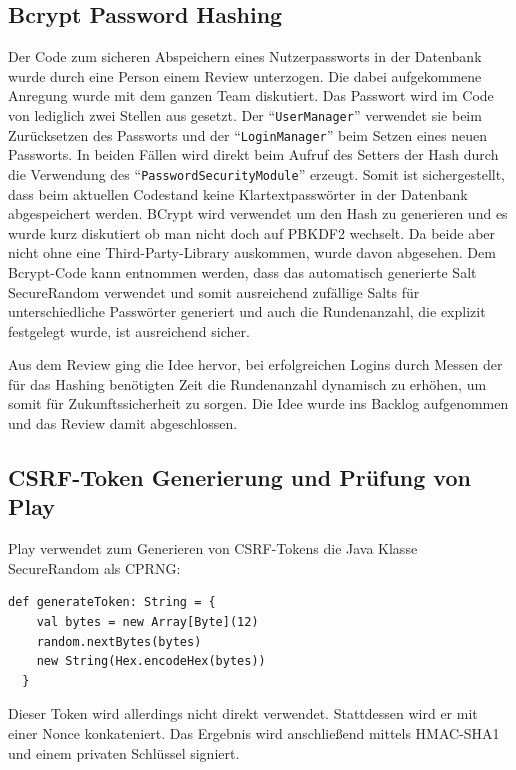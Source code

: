 \documentclass[12pt,DIV14,BCOR10mm,a4paper,parskip=half-,headsepline,headinclude,english,ngerman,bibliography=totocnumbered]{scrreprt}
\begin{document}
\subsection{Bcrypt Password Hashing}
Der Code zum sicheren Abspeichern eines Nutzerpassworts in der Datenbank wurde durch eine Person einem Review unterzogen. Die dabei aufgekommene Anregung wurde mit dem ganzen Team diskutiert. Das Passwort wird im Code von lediglich zwei Stellen aus gesetzt. Der \enquote{\texttt{UserManager}} verwendet sie beim Zurücksetzen des Passworts und der \enquote{\texttt{LoginManager}} beim Setzen eines neuen Passworts. In beiden Fällen wird direkt beim Aufruf des Setters der Hash durch die Verwendung des \enquote{\texttt{PasswordSecurityModule}} erzeugt. Somit ist sichergestellt, dass beim aktuellen Codestand keine Klartextpasswörter in der Datenbank abgespeichert werden. BCrypt wird verwendet um den Hash zu generieren und es wurde kurz diskutiert ob man nicht doch auf PBKDF2 wechselt. Da beide aber nicht ohne eine Third-Party-Library auskommen, wurde davon abgesehen. Dem Bcrypt-Code \autocite{BcryptCode} kann entnommen werden, dass das automatisch generierte Salt SecureRandom verwendet und somit ausreichend zufällige Salts für unterschiedliche Passwörter generiert und auch die Rundenanzahl, die explizit festgelegt wurde, ist ausreichend sicher.

Aus dem Review ging die Idee hervor, bei erfolgreichen Logins durch Messen der für das Hashing benötigten Zeit die Rundenanzahl dynamisch zu erhöhen, um somit für Zukunftssicherheit zu sorgen. Die Idee wurde ins Backlog aufgenommen und das Review damit abgeschlossen.



\subsection{CSRF-Token Generierung und Prüfung von Play}
Play verwendet zum Generieren von CSRF-Tokens die Java Klasse SecureRandom als CPRNG:

\begin{lstlisting}[label=csrfGenerateToken, caption={Methode zum Generieren von Tokens. Aus DefaultCSRFTokenSigner, Play 2.6.20},captionpos=b]
  def generateToken: String = {
    val bytes = new Array[Byte](12)
    random.nextBytes(bytes)
    new String(Hex.encodeHex(bytes))
  }
\end{lstlisting}
Dieser Token wird allerdings nicht direkt verwendet. Stattdessen wird er mit einer Nonce konkateniert. Das Ergebnis wird anschließend mittels HMAC-SHA1 und einem privaten Schlüssel signiert.
\end{document}
